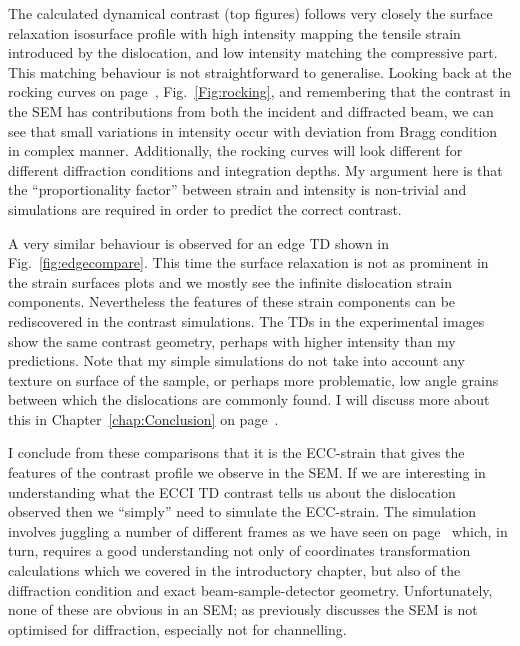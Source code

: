 The calculated dynamical contrast (top figures) follows very closely the surface relaxation isosurface profile with high intensity mapping the tensile strain introduced by the dislocation, and low intensity matching the compressive part. This matching behaviour is not straightforward to generalise. Looking back at the rocking curves on page~\pageref{Fig:rocking}, Fig.~\ref{Fig:rocking}, and remembering that the contrast in the SEM has contributions from both the incident and diffracted beam, we can see that small variations in intensity occur with deviation from Bragg  condition in complex manner. Additionally, the rocking curves will look different for different diffraction conditions and integration depths. My argument here is that the ``proportionality factor'' between strain and intensity is non-trivial and simulations are required in order to predict the correct contrast. 



A very similar behaviour is observed for an edge TD shown in Fig.~\ref{fig:edgecompare}. This time the surface relaxation is not as prominent in the strain surfaces plots and we mostly see the infinite dislocation strain components. Nevertheless the features of these strain components can be rediscovered in the contrast simulations. The TDs in the experimental images show the same contrast geometry, perhaps with higher intensity than my predictions. Note that my simple simulations do not take into account any texture on surface of the sample, or perhaps more problematic, low angle grains between which the dislocations are commonly found. I will discuss more about this in Chapter~\ref{chap:Conclusion} on page~\pageref{chap:Conclusion}.


I conclude from these comparisons that it is the ECC-strain that gives the features of the contrast profile we observe in the SEM. If we are interesting in understanding what the ECCI TD contrast tells us about the dislocation observed then we ``simply'' need to simulate the ECC-strain. The simulation involves juggling a number of different frames as we have seen on page~\pageref{sec:coordinates} which, in turn, requires a good understanding not only of coordinates transformation calculations which we covered in the introductory chapter, but also of the diffraction condition and exact beam-sample-detector geometry. Unfortunately, none of these are obvious in an SEM; as previously discusses the SEM is not optimised for diffraction, especially not for channelling.






